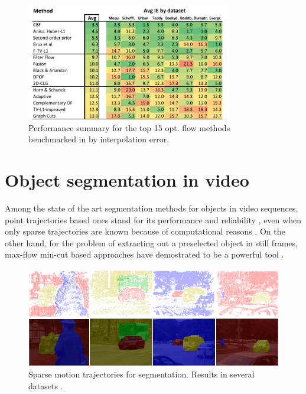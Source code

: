    \begin{figure}[thpb]
      \centering
      \includegraphics[width=0.8\textwidth]{../images/of_performance.png}
      \caption{ Performance summary for the top 15 opt. flow methods benchmarked in \cite{c17} by interpolation error. }
      \label{of_per}
   \end{figure}

\section{Object segmentation in video}

Among the state of the art segmentation methods for objects in video
sequences, point trajectories based ones stand for its performance and 
reliability \cite{c33}, even when only sparse trajectories are known because of
computational reasons \cite{c34}. On the other hand, for the problem of extracting out a 
preselected object in still frames, max-flow min-cut based approaches 
have demostrated to be a powerful tool \cite{c14}\cite{c18}. 

   \begin{figure}[bhp]
      \centering
      \includegraphics[height=0.275\textheight]{../images/point_traj_segm.png}
      \caption{  Sparse motion trajectories for segmentation. Results in several datasets  \cite{c34}. }
      \label{pt_seg}
   \end{figure}


